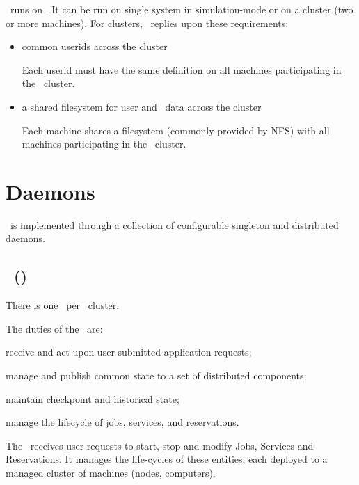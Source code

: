     \varDUCC~runs on \varLinux. It can be run on single system in simulation-mode
    or on a cluster (two or more machines). For clusters, \varDUCC~replies upon 
    these requirements:
    
    \begin{itemize}
      \item common userids across the cluster
      
      Each userid must have the same definition on all machines participating
      in the \varDUCC~cluster.
      
      \item a shared filesystem for user and \varDUCC~data across the cluster
      
      Each machine shares a filesystem (commonly provided by NFS) with all 
      machines participating in the \varDUCC~cluster.
      
    \end{itemize} 
    
    \section{Daemons}
    
    \varDUCC~is implemented through a collection of configurable singleton 
    and distributed daemons.
    
    \subsection{\varOrchestrator~(\varOR)} 
    
    There is one \varOrchestrator~per \varDUCC~cluster.
    
    The duties of the \varOrchestrator~are:
    
    \begin{description}
      \item receive and act upon user submitted application requests;
      \item manage and publish common state to a set of distributed components;
      \item maintain checkpoint and historical state;
      \item manage the lifecycle of jobs, services, and reservations.
    \end{description}
    
    The \varOrchestrator~receives user requests to start, stop and modify 
    Jobs, Services and Reservations. It manages the life-cycles of these
    entities, each deployed to a managed cluster of machines 
    (nodes, computers).
    
